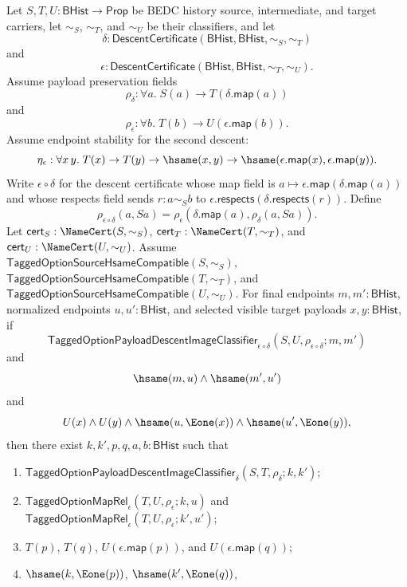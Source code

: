 \begin{theorem}
\label{thm:tagged-option-composite-image-classifier-normalized-selected-visible-public-factorization}
Let $S,T,U:\mathsf{BHist}\to\mathsf{Prop}$ be BEDC history source,
intermediate, and target carriers, let $\sim_S$, $\sim_T$, and $\sim_U$ be their
classifiers, and let
$$
\delta:\mathsf{DescentCertificate}(\mathsf{BHist},\mathsf{BHist},\sim_S,\sim_T)
$$
and
$$
\epsilon:\mathsf{DescentCertificate}(\mathsf{BHist},\mathsf{BHist},\sim_T,\sim_U).
$$
Assume payload preservation fields
$$
\rho_{\delta}:\forall a.\;S(a)\to T(\delta.\mathsf{map}(a))
$$
and
$$
\rho_{\epsilon}:\forall b.\;T(b)\to U(\epsilon.\mathsf{map}(b)).
$$
Assume endpoint stability for the second descent:
$$
\eta_{\epsilon}:\forall x\,y.\;
T(x)\to T(y)\to \hsame(x,y)\to
\hsame(\epsilon.\mathsf{map}(x),\epsilon.\mathsf{map}(y)).
$$
Write $\epsilon\circ\delta$ for the descent certificate whose map field is
$a\mapsto\epsilon.\mathsf{map}(\delta.\mathsf{map}(a))$ and whose respects field
sends $r:a\sim_S b$ to
$\epsilon.\mathsf{respects}(\delta.\mathsf{respects}(r))$. Define
$$
\rho_{\epsilon\circ\delta}(a,Sa)=
\rho_{\epsilon}(\delta.\mathsf{map}(a),\rho_{\delta}(a,Sa)).
$$
Let $\mathsf{cert}_S:\NameCert(S,\sim_S)$,
$\mathsf{cert}_T:\NameCert(T,\sim_T)$, and
$\mathsf{cert}_U:\NameCert(U,\sim_U)$. Assume
$\mathsf{TaggedOptionSourceHsameCompatible}(S,\sim_S)$,
$\mathsf{TaggedOptionSourceHsameCompatible}(T,\sim_T)$, and
$\mathsf{TaggedOptionSourceHsameCompatible}(U,\sim_U)$. For final endpoints
$m,m':\mathsf{BHist}$, normalized endpoints $u,u':\mathsf{BHist}$, and selected
visible target payloads $x,y:\mathsf{BHist}$, if
$$
\mathsf{TaggedOptionPayloadDescentImageClassifier}_{\epsilon\circ\delta}
(S,U,\rho_{\epsilon\circ\delta};m,m')
$$
and
$$
\hsame(m,u)\land \hsame(m',u')
$$
and
$$
U(x)\land U(y)\land
\hsame(u,\Eone(x))\land \hsame(u',\Eone(y)),
$$
then there exist $k,k',p,q,a,b:\mathsf{BHist}$ such that
\begin{enumerate}
\item $\mathsf{TaggedOptionPayloadDescentImageClassifier}_{\delta}
(S,T,\rho_{\delta};k,k')$;
\item $\mathsf{TaggedOptionMapRel}_{\epsilon}(T,U,\rho_{\epsilon};k,u)$ and
$\mathsf{TaggedOptionMapRel}_{\epsilon}(T,U,\rho_{\epsilon};k',u')$;
\item $T(p)$, $T(q)$, $U(\epsilon.\mathsf{map}(p))$, and
$U(\epsilon.\mathsf{map}(q))$;
\item $\hsame(k,\Eone(p))$, $\hsame(k',\Eone(q))$,

\end{enumerate}
\end{theorem}
